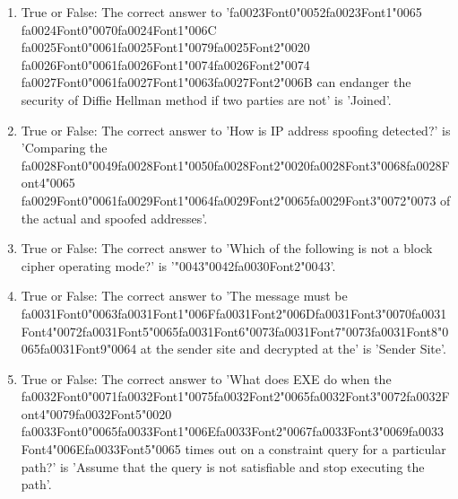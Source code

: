 \documentclass[12pt]{article}
\begin{document}
\begin{enumerate}[label=\arabic*.]
\item True or False: The correct answer to '{\csname fa0023Font0\endcsname\char"0052}{\csname fa0023Font1\endcsname\char"0065} {\csname fa0024Font0\endcsname\char"0070}{\csname fa0024Font1\endcsname\char"006C} {\csname fa0025Font0\endcsname\char"0061}{\csname fa0025Font1\endcsname\char"0079}{\csname fa0025Font2\endcsname\char"0020} {\csname fa0026Font0\endcsname\char"0061}{\csname fa0026Font1\endcsname\char"0074}{\csname fa0026Font2\endcsname\char"0074} {\csname fa0027Font0\endcsname\char"0061}{\csname fa0027Font1\endcsname\char"0063}{\csname fa0027Font2\endcsname\char"006B} can endanger the security of Diffie Hellman method if two parties are not' is 'Joined'.
\item True or False: The correct answer to 'How is IP address spoofing detected?' is 'Comparing the {\csname fa0028Font0\endcsname\char"0049}{\csname fa0028Font1\endcsname\char"0050}{\csname fa0028Font2\endcsname\char"0020}{\csname fa0028Font3\endcsname\char"0068}{\csname fa0028Font4\endcsname\char"0065} {\csname fa0029Font0\endcsname\char"0061}{\csname fa0029Font1\endcsname\char"0064}{\csname fa0029Font2\endcsname\char"0065}{\csname fa0029Font3\endcsname\char"0072}{\char"0073} of the actual and spoofed addresses'.
\item True or False: The correct answer to 'Which of the following is not a block cipher operating mode?' is '{\char"0043}{\char"0042}{\csname fa0030Font2\endcsname\char"0043}'.
\item True or False: The correct answer to 'The message must be {\csname fa0031Font0\endcsname\char"0063}{\csname fa0031Font1\endcsname\char"006F}{\csname fa0031Font2\endcsname\char"006D}{\csname fa0031Font3\endcsname\char"0070}{\csname fa0031Font4\endcsname\char"0072}{\csname fa0031Font5\endcsname\char"0065}{\csname fa0031Font6\endcsname\char"0073}{\csname fa0031Font7\endcsname\char"0073}{\csname fa0031Font8\endcsname\char"0065}{\csname fa0031Font9\endcsname\char"0064} at the sender site and decrypted at the' is 'Sender Site'.
\item True or False: The correct answer to 'What does EXE do when the {\csname fa0032Font0\endcsname\char"0071}{\csname fa0032Font1\endcsname\char"0075}{\csname fa0032Font2\endcsname\char"0065}{\csname fa0032Font3\endcsname\char"0072}{\csname fa0032Font4\endcsname\char"0079}{\csname fa0032Font5\endcsname\char"0020} {\csname fa0033Font0\endcsname\char"0065}{\csname fa0033Font1\endcsname\char"006E}{\csname fa0033Font2\endcsname\char"0067}{\csname fa0033Font3\endcsname\char"0069}{\csname fa0033Font4\endcsname\char"006E}{\csname fa0033Font5\endcsname\char"0065} times out on a constraint query for a particular path?' is 'Assume that the query is not satisfiable and stop executing the path'.
\end{enumerate}
\end{document}

